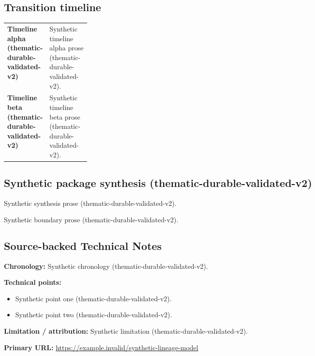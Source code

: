 \documentclass[lualatex,a4paper,10pt]{jlreq}
\begin{document}
\medskip
\begin{wideflow}
\subsection*{Transition timeline}
\begin{tabularx}{\linewidth}{@{}>{\bfseries}p{0.20\linewidth}X@{}}
Timeline alpha (thematic-durable-validated-v2) & Synthetic timeline alpha prose (thematic-durable-validated-v2). \cite{sp001lnd001} \\
Timeline beta (thematic-durable-validated-v2) & Synthetic timeline beta prose (thematic-durable-validated-v2). \cite{sp001lnd001} \\
\end{tabularx}
\end{wideflow}
\medskip
\begin{multicols}{2}
\subsection*{Synthetic package synthesis (thematic-durable-validated-v2)}
\noindent Synthetic synthesis prose (thematic-durable-validated-v2). \cite{sp001lnd001}\par\medskip
\end{multicols}
\medskip
\begin{claimboundary}
\noindent Synthetic boundary prose (thematic-durable-validated-v2). \cite{sp001lnd001}\par
\end{claimboundary}
\medskip
\subsection*{Source-backed Technical Notes}
\begin{technicalnote}
\noindent\textbf{Chronology:} Synthetic chronology (thematic-durable-validated-v2). \cite{sp001lnd001}\par
\smallskip\noindent\textbf{Technical points:}\par
\begin{itemize}
\item Synthetic point one (thematic-durable-validated-v2). \cite{sp001lnd001}
\item Synthetic point two (thematic-durable-validated-v2). \cite{sp001lnd001}
\end{itemize}
\noindent\textbf{Limitation / attribution:} Synthetic limitation (thematic-durable-validated-v2).\par
\smallskip\noindent\textbf{Primary URL:} \url{https://example.invalid/synthetic-lineage-model}\par
\end{technicalnote}
\smallskip
\Needspace{0.30\textheight}
\end{document}
